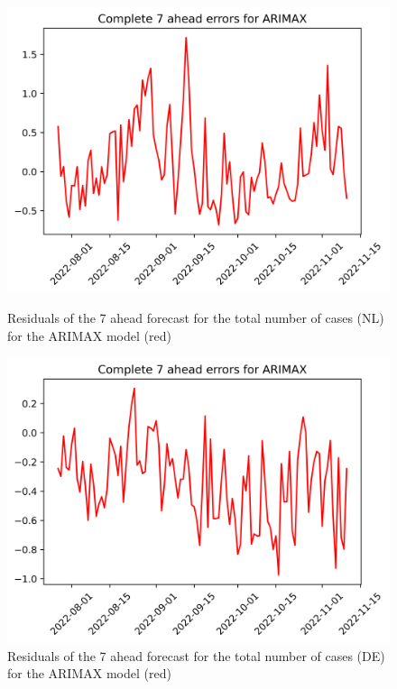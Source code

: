 \begin{figure}

\begin{minipage}{.45\textwidth}
  \centering
  \includegraphics[width=\linewidth]{pics/7_ah/7_ahead_errors_ARIMAX.png}
  \caption{Residuals of the 7 ahead forecast for the total number of cases (NL) for the ARIMAX model (red)}
  \label{fig:tot_cases_error_7_ARIMAX}
\end{minipage}
\begin{minipage}{.45\textwidth}
  \centering
  \includegraphics[width=\linewidth]{pics/7_ah/DE_7_ahead_errors_ARIMAX.png}
  \caption{Residuals of the 7 ahead forecast for the total number of cases (DE) for the ARIMAX model (red)}
  \label{fig:tot_cases_error_7_ARIMAX_DE}
\end{minipage}

\end{figure}
